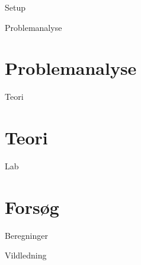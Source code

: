 

\raggedbottom



\frontmatter %


	\begin{folderinput}{Setup}

\cleardoublepage

\cleardoublepage

\tableofcontents*												%

	\end{folderinput}

\mainmatter %

	\begin{folderinput}{Problemanalyse}
\chapter{Problemanalyse}







	\end{folderinput}
	
\begin{folderinput} {Teori}
\chapter{Teori}


\end{folderinput}

	\begin{folderinput}{Lab}
\chapter{Forsøg}

	\end{folderinput}

	\begin{folderinput}{Beregninger}

	\end{folderinput}

	\begin{folderinput}{Vildledning}

	\end{folderinput}
	
	


\appendix
\clearforchapter
{}
{}


%
